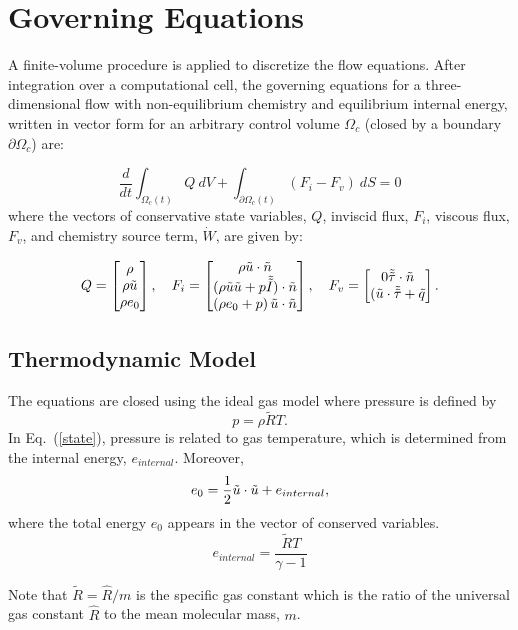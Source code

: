 
\section{Governing Equations}
A finite-volume procedure is applied to discretize the flow equations.
After integration over a computational cell, the governing equations
for a three-dimensional flow with non-equilibrium chemistry and
equilibrium internal energy, written in vector form for an arbitrary control 
volume $\Omega_c$ (closed by a boundary $\partial\Omega_c$) are: 

\begin{equation}
\frac{d}{dt} \int_{\Omega_c(t)} Q ~dV +
\int_{{\partial\Omega_c}(t)} (F_i-F_v) ~dS = 0
\label{gov_integral}
\end{equation}
where the vectors of conservative state variables, $Q$, inviscid flux, $F_i$, 
viscous flux, $F_v$, and chemistry source term, $\Dot{W}$, are given by:

\begin{equation}
Q =
\begin{bmatrix}
\rho \\
\rho \Tilde{u} \\
\rho e_0
\end{bmatrix}
,\quad
F_i =
\begin{bmatrix}
\rho \Tilde{u} \cdot \Tilde{n} \\
(\rho \Tilde{u} \Tilde{u} + p \Tilde{\Tilde{I}})\cdot \Tilde{n}\\
\left(\rho e_0 + p\right)\Tilde{u} \cdot \Tilde{n}
\end{bmatrix}, \quad
F_v =
\begin{bmatrix}
0
\Tilde{\Tilde{\tau}} \cdot \Tilde{n}\\
(\Tilde{u} \cdot\Tilde{\Tilde{\tau}} + \Tilde{q} 
\end{bmatrix}
. 
\end{equation}

\subsection{Thermodynamic Model}

The equations are closed using the ideal gas model where pressure is defined
by 
\begin{equation}
p = \rho \tilde{R} T.
\label{state}
\end{equation}
In Eq.~(\ref{state}),
pressure is related to gas temperature, which is determined from the
internal energy, $e_{internal}$.  Moreover,
\begin{equation}
e_0 = \frac{1}{2}\Tilde{u} \cdot \Tilde{u} + e_{internal} ,
\label{energy}
\end{equation}
where the total energy $e_0$ appears in the vector of conserved
variables.
\begin{equation}
e_{internal} = \frac{\tilde{R} T}{\gamma - 1}
\end{equation} 

Note that $\tilde{R}=\hat{R}/m$ is the specific gas constant which is
the ratio of the universal gas constant $\hat{R}$ to the mean
molecular mass, $m$.

